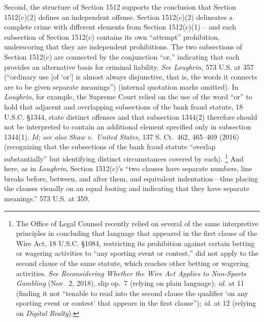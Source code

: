 Second, the structure of Section 1512 supports the conclusion that Section 1512(c)(2) defines an independent offense.
Section 1512(c)(2) delineates a complete crime with different elements from Section 1512(c)(1) -- and each subsection of Section 1512(c) contains its own “attempt” prohibition, underscoring that they are independent prohibitions.
The two subsections of Section 1512(c) are connected by the conjunction “or,” indicating that each provides an alternative basis for criminal liability.
\textit{See Loughrin}, 573 U.S. at 357 (“ordinary use [of ‘or’] is almost always disjunctive, that is, the words it connects are to be given separate meanings”) (internal quotation marks omitted).
In \textit{Loughrin}, for example, the Supreme Court relied on the use of the word “or” to hold that adjacent and overlapping subsections of the bank fraud statute, 18 U.S.C. \S 1344, state distinct offenses and that subsection 1344(2) therefore should not be interpreted to contain an additional element specified only in subsection 1344(1).
\textit{Id; see also Shaw v.\ United States}, 137 S. Ct.~462, 465--469 (2016) (recognizing that the subsections of the bank fraud statute “overlap substantially” but identifying distinct circumstances covered by each).%
\footnote{The Office of Legal Counsel recently relied on several of the same interpretive principles in concluding that language that appeared in the first clause of the Wire Act, 18 U.S.C. \S 1084, restricting its prohibition against certain betting or wagering activities to “any sporting event or contest,” did not apply to the second clause of the same statute, which reaches other betting or wagering activities.
\textit{See Reconsidering Whether the Wire Act Applies to Non-Sports Gambling} (Nov.~2, 2018), slip op.~7 (relying on plain language);
\textit{id}. at 11 (finding it not “tenable to read into the second clause the qualifier ‘on any sporting event or contest’ that appears in the first clause”);
\textit{id}. at 12 (relying on \textit{Digital Realty}).}
And here, as in \textit{Loughrin}, Section 1512(c)’s “two clauses have separate numbers, line breaks before, between, and after them, and equivalent indentation---thus placing the clauses visually on an equal footing and indicating that they have separate meanings.” 573 U.S. at 359.

